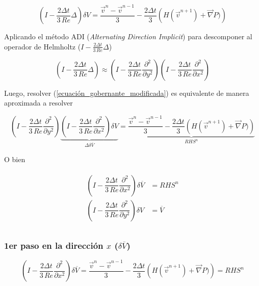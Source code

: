 \begin{equation} \label{ecuación_gobernante_modificada}
\left( I - \dfrac{2 \Delta t}{3 \, Re} \Delta \right) \delta V = \dfrac{\vec{v}^n-\vec{v}^{n-1}}{3} - \dfrac{2 \Delta t}{3} \left( H(\vec{v}^{n+1}) + \vec{\nabla} P) \right)
\end{equation} 

Aplicando el método ADI (\textit{Alternating Direction Implicit}) para descomponer al operador de Helmholtz ($I - \frac{2 \Delta t}{3 \, Re} \Delta $)

\begin{equation}
\left( I - \dfrac{2 \Delta t}{3 \, Re} \Delta \right) \approx \left( I - \dfrac{2 \Delta t}{3 \, Re} \dfrac{\partial^2}{\partial y^2} \right) \left( I - \dfrac{2 \Delta t}{3 \, Re} \dfrac{\partial^2}{\partial x^2} \right)
\end{equation}

Luego, resolver (\ref{ecuación_gobernante_modificada}) es equivalente de manera aproximada a resolver

\begin{equation}
\left( I - \dfrac{2 \Delta t}{3 \, Re} \dfrac{\partial^2}{\partial y^2} \right) \underbrace{ \left( I - \dfrac{2 \Delta t}{3 \, Re} \dfrac{\partial^2}{\partial x^2} \right) \delta V }_{\Delta \delta \overline{V}} = \underbrace{ \dfrac{\vec{v}^n-\vec{v}^{n-1}}{3} - \dfrac{2 \Delta t}{3} \left( H(\vec{v}^{n+1}) + \vec{\nabla} P) \right) }_{RHS^n} 
\end{equation}

O bien

\begin{align}
\begin{split}
\left( I - \dfrac{2 \Delta t}{3 \, Re} \dfrac{\partial^2}{\partial x^2} \right) \delta \overline{V} &= RHS^n \\ 
\left( I - \dfrac{2 \Delta t}{3 \, Re} \dfrac{\partial^2}{\partial y^2} \right) \delta V &= \overline{V} \\  
\end{split}
\end{align}

\subsubsection{1er paso en la dirección $x$ ($\delta \overline{V}$)} 

\begin{equation}
\left( I - \dfrac{2 \Delta t}{3 \, Re} \dfrac{\partial^2}{\partial x^2} \right) \delta \overline{V} = \dfrac{\vec{v}^n-\vec{v}^{n-1}}{3} - \dfrac{2 \Delta t}{3} \left( H(\vec{v}^{n+1}) + \vec{\nabla} P) \right) = RHS^n
\end{equation}

